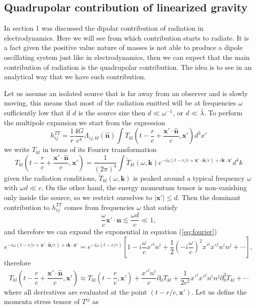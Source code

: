 \subsection{Quadrupolar contribution of linearized gravity}

In section 1 was discussed the dipolar contribution of radiation in
electrodynamics. Here we will see from which contribution starts to
radiate. It is a fact given the positive value nature of masses is
not able to produce a dipole oscillating system just like in electrodynamics,
then we can expect that the main contribution of radiation is the
quadrupolar contribution. The idea is to see in an analytical way
that we have such contribution.

Let us assume an isolated source that is far away from an observer
and is slowly moving, this means that most of the radiation emitted
will be at frequencies $\omega$ sufficiently low that if $d$ is
the source size then $d\ll\omega^{-1}$, or $d\ll\bar{\lambda}$.
To perform the multipole expansion we start from the expression
\[
h_{ij}^{TT}=\frac{1}{r}\frac{4G}{c^{4}}\Lambda_{ij,kl}\left(\hat{\boldsymbol{n}}\right)\int T_{kl}\left(t-\frac{r}{c}+\frac{\boldsymbol{x}'\cdot\hat{\boldsymbol{n}}}{c},\boldsymbol{x}'\right)d^{3}x'
\]
we write $T_{kl}$ in terms of its Fourier transformation
\begin{equation}
T_{kl}\left(t-\frac{r}{c}+\frac{\boldsymbol{x}'\cdot\hat{\boldsymbol{n}}}{c},\boldsymbol{x}'\right)=\frac{1}{\left(2\pi\right)^{4}}\int\widetilde{T}_{kl}\left(\omega,\boldsymbol{k}\right)e^{-i\omega\left(t-r/c+\boldsymbol{x}'\cdot\hat{\boldsymbol{n}}/c\right)+i\boldsymbol{k}\cdot\boldsymbol{x}'}d^{4}k\label{eq:fourier}
\end{equation}
given the radiation conditions, $\widetilde{T}_{kl}\left(\omega,\boldsymbol{k}\right)$
is peaked around a typical frequency $\omega$ with $\omega d\ll c$.
On the other hand, the energy momentum tensor is non-vanishing only
inside the source, so we restrict ourselves to $\left|\boldsymbol{x}'\right|\leq d$.
Then the dominant contribution to $h_{ij}^{TT}$ comes from frequencies
$\omega$ that satisfy
\[
\frac{\omega}{c}\boldsymbol{x}'\cdot\boldsymbol{n}\apprle\frac{\omega d}{c}\ll 1,
\]
and therefore we can expand the exponential in equation (\ref{eq:fourier})
\[
e^{-i\omega\left(t-r/c+\boldsymbol{x}'\cdot\hat{\boldsymbol{n}}/c\right)+i\boldsymbol{k}\cdot\boldsymbol{x}'}=e^{-i\omega\left(t-r/c\right)}\left[1-i\frac{\omega}{c}{x'}^{i}n^{i}+\frac{1}{2}\left(-i\frac{\omega}{c}\right)^{2}{x'}^{i}{x'}^{j}n^{i}n^{j}+\cdots\right],
\]
therefore
\[
T_{kl}\left(t-\frac{r}{c}+\frac{\boldsymbol{x}'\cdot\hat{\boldsymbol{n}}}{c},\boldsymbol{x}'\right)\approx T_{kl}\left(t-\frac{r}{c},\boldsymbol{x}'\right)+\frac{{x'}^{i}n^{i}}{c}\partial_{0}T_{kl}+\frac{1}{2c^{2}}{x'}^{i}{x'}^{j}n^{i}n^{j}\partial_{0}^{2}T_{kl}+\cdots
\]
where all derivatives are evaluated at the point $\left(t-r/c,\boldsymbol{x}'\right)$.
Let us define the momenta stress tensor of $T^{ij}$ as

